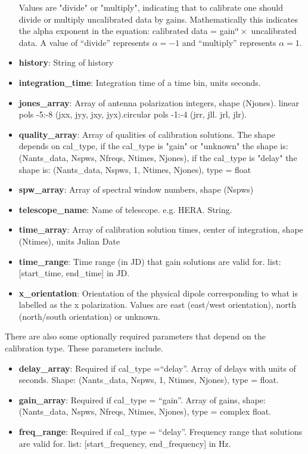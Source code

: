 \documentclass[11pt, oneside]{article}   	%
\begin{document}
\begin{itemize}
{    Values are "divide" or "multiply", indicating that to calibrate one should divide or multiply
    uncalibrated data by gains. Mathematically this indicates the alpha exponent in the equation: 
    calibrated data = gain$^{\alpha} \times $ uncalibrated data. A value of
    ``divide'' represents $\alpha=-1$ and ``multiply'' represents $\alpha=1$.}
\item{\textbf{history}: String of history}
\item{\textbf{integration\_time}: Integration time of a time bin, units seconds.}
\item{\textbf{jones\_array}: Array of antenna polarization integers, shape
    (Njones). linear pols -5:-8 (jxx, jyy, jxy, jyx).circular pols -1:-4 (jrr,
    jll. jrl, jlr).}
\item{\textbf{quality\_array}: Array of qualities of calibration solutions. The
    shape depends on cal\_type, if the cal\_type is "gain" or "unknown" the shape is:
    (Nants\_data, Nspws, Nfreqs, Ntimes, Njones), if the cal\_type is "delay" the shape is: 
    (Nants_data, Nspws, 1, Ntimes, Njones), type = float}
\item{\textbf{spw\_array}: Array of spectral window numbers, shape (Nspws)}
\item{\textbf{telescope\_name}: Name of telescope. e.g. HERA. String.}
\item{\textbf{time\_array}: Array of calibration solution times, center of integration, shape
    (Ntimes), units Julian Date}
\item{\textbf{time\_range}: Time range (in JD) that gain solutions are valid
    for. list: [start\_time, end\_time] in JD.}
\item{\textbf{x\_orientation}: Orientation of the physical dipole corresponding
    to what is labelled as the x polarization. Values are east (east/west
    orientation), north (north/south orientation) or unknown.}
\end{itemize}

There are also some optionally required parameters that depend on the
calibration type. These parameters include.
\begin{itemize}
\item{\textbf{delay\_array}: Required if cal\_type =``delay''. Array of delays with
    units of seconds. Shape: (Nants_data, Nspws, 1, Ntimes, Njones), type = float.}
\item{\textbf{gain\_array}: Required if cal\_type = ``gain''. Array of gains, 
    shape: (Nants_data, Nspws, Nfreqs, Ntimes, Njones), type = complex float.}
\item{\textbf{freq\_range}: Required if cal\_type = ``delay''. Frequency range that
   solutions are valid for. list: [start_frequency, end_frequency] in Hz.}
\end{itemize}
\end{document}

